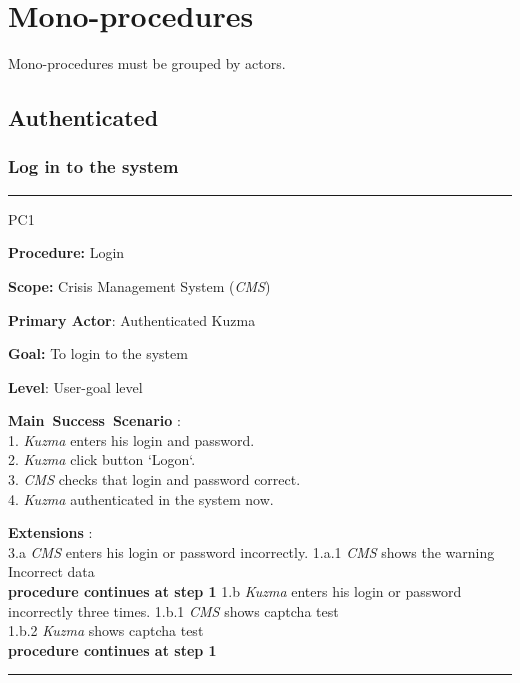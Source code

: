 \section{Mono-procedures}
Mono-procedures must be grouped by actors.


\subsection{Authenticated}

\subsubsection{Log in to the system}
\vspace{0.5cm}
\hrule
\begin{lyxlist}{PC1}
\small{
\item [\textbf{Procedure:}] Login
\item [\textbf{Scope:}] Crisis Management System (\emph{CMS})
\item [\textbf{Primary Actor}:] Authenticated Kuzma
\item [\textbf{Goal:}] To login to the system
\item [\textbf{Level}:] User-goal level
\item [\textbf{Main~Success~Scenario}]:\\
1. \emph{Kuzma} enters his login and password. \\
2. \emph{Kuzma} click button `Logon`.\\
3. \emph{CMS} checks that login and password correct.\\
4. \emph{Kuzma} authenticated in the system now.\\

\item [\textbf{Extensions}]:\\
3.a \emph{CMS} enters his login or password incorrectly.
\hspace*{0.5cm} 1.a.1 \emph{CMS} shows the warning Incorrect data\\ 
\hspace*{0.5cm} \textbf{procedure continues at step 1}
1.b \emph{Kuzma} enters his login or password incorrectly three times.
\hspace*{0.5cm} 1.b.1 \emph{CMS} shows captcha test\\ 
\hspace*{0.5cm} 1.b.2 \emph{Kuzma} shows captcha test\\ 
\hspace*{0.5cm} \textbf{procedure continues at step 1}

}

\end{lyxlist}
\hrule
\vspace{0.5cm}


